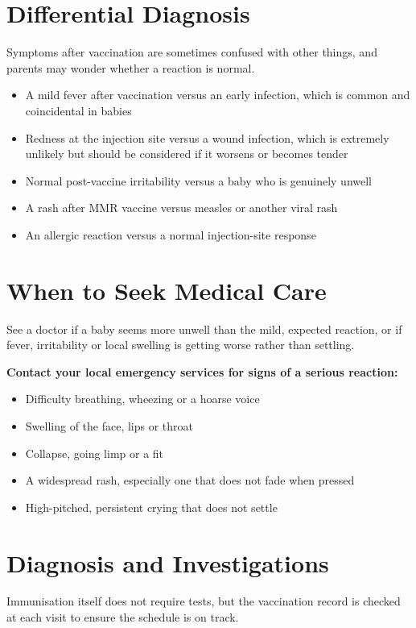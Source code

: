 \section*{Differential Diagnosis}
Symptoms after vaccination are sometimes confused with other things, and parents may wonder whether a reaction is normal.

\begin{itemize}
    \item A mild fever after vaccination versus an early infection, which is common and coincidental in babies
    \item Redness at the injection site versus a wound infection, which is extremely unlikely but should be considered if it worsens or becomes tender
    \item Normal post-vaccine irritability versus a baby who is genuinely unwell
    \item A rash after MMR vaccine versus measles or another viral rash
    \item An allergic reaction versus a normal injection-site response
\end{itemize}

\section*{When to Seek Medical Care}
See a doctor if a baby seems more unwell than the mild, expected reaction, or if fever, irritability or local swelling is getting worse rather than settling.

\textbf{Contact your local emergency services for signs of a serious reaction:}
\begin{itemize}
    \item Difficulty breathing, wheezing or a hoarse voice
    \item Swelling of the face, lips or throat
    \item Collapse, going limp or a fit
    \item A widespread rash, especially one that does not fade when pressed
    \item High-pitched, persistent crying that does not settle
\end{itemize}

\section*{Diagnosis and Investigations}
Immunisation itself does not require tests, but the vaccination record is checked at each visit to ensure the schedule is on track.

